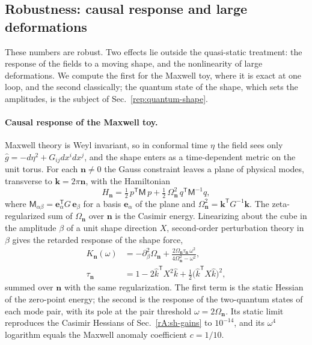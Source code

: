 \subsection{Robustness: causal response and large deformations}
\label{rA:sh-robust}

These numbers are robust.
Two effects lie outside the quasi-static treatment: the response of the fields to a moving shape, and the nonlinearity of large deformations.
We compute the first for the Maxwell toy, where it is exact at one loop, and the second classically; the quantum state of the shape, which sets the amplitudes, is the subject of Sec.~\ref{rep:quantum-shape}.

\paragraph{Causal response of the Maxwell toy.}
Maxwell theory is Weyl invariant, so in conformal time $\eta$ the field sees only $\hat g=-d\eta^2+G_{ij}dx^idx^j$, and the shape enters as a time-dependent metric on the unit torus.
For each $\bm n\neq0$ the Gauss constraint leaves a plane of physical modes, transverse to $\bm k=2\pi\bm n$, with the Hamiltonian
\begin{equation}
H_{\bm n}=\tfrac12\,p^{\mathsf T}\mathsf M\,p+\tfrac12\,\Omega_{\bm n}^2\,q^{\mathsf T}\mathsf M^{-1}q,
\label{eq:rA-Hn}
\end{equation}
where $\mathsf M_{\alpha\beta}=\bm e_\alpha^{\mathsf T}G\,\bm e_\beta$ for a basis $\bm e_\alpha$ of the plane and $\Omega_{\bm n}^2=\bm k^{\mathsf T}G^{-1}\bm k$.
The zeta-regularized sum of $\Omega_{\bm n}$ over $\bm n$ is the Casimir energy.
Linearizing about the cube in the amplitude $\beta$ of a unit shape direction $X$, second-order perturbation theory in $\beta$ gives the retarded response of the shape force,
\begin{equation}
\begin{aligned}
K_{\bm n}(\omega)&=-\partial_\beta^2\Omega_{\bm n}+\frac{2\Omega_{\bm n}\tau_{\bm n}\,\omega^2}{4\Omega_{\bm n}^2-\omega^2},\\
\tau_{\bm n}&=1-2\hat k^{\mathsf T}X^2\hat k+\tfrac12\big(\hat k^{\mathsf T}X\hat k\big)^2,
\end{aligned}
\label{eq:rA-kernel}
\end{equation}
summed over $\bm n$ with the same regularization.
The first term is the static Hessian of the zero-point energy; the second is the response of the two-quantum states of each mode pair, with its pole at the pair threshold $\omega=2\Omega_{\bm n}$.
Its static limit reproduces the Casimir Hessians of Sec.~\ref{rA:sh-gains} to $10^{-14}$, and its $\omega^4$ logarithm equals the Maxwell anomaly coefficient $c=1/10$. %

